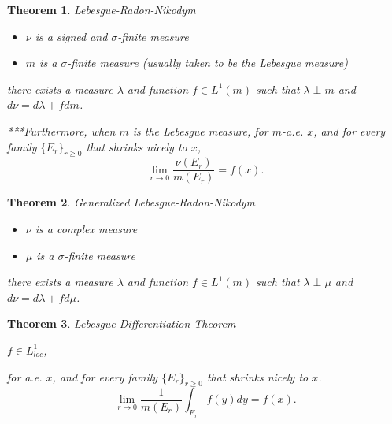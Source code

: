\documentclass[12pt]{Qual}
\newtheorem{theorem}{Theorem}
\begin{document}
\begin{theorem}{\Large\textit{Lebesgue-Radon-Nikodym}}

\vspace{-0.25cm}
\begin{itemize}[leftmargin=2.5cm]
\setlength\itemsep{-0.1em}
\renewcommand\labelitemi{\faPuzzlePiece}
    \item $\nu$ is a signed and $\sigma$-finite measure
    \item $m$ is a $\sigma$-finite measure (usually taken to be the Lebesgue measure)
\end{itemize}

 \hspace{0.1cm}\begin{minipage}{0.85\textwidth}
\vspace{0.45cm}
there exists a measure $\lambda$ and function $f\in L^1(m)$ such that $\lambda\perp m$ and $d\nu=d\lambda+fdm$.
\end{minipage}

\begin{mybox}
***Furthermore, when $m$ is the Lebesgue measure, for $m$-a.e. $x$, and for every family $\{E_r\}_{r\ge0}$ that shrinks nicely to $x$, $$\lim_{r\to0}\frac{\nu(E_r)}{m(E_r)}=f(x).$$
\end{mybox}

\end{theorem}
\vspace{0.5cm}
\begin{theorem}{\Large\textit{Generalized Lebesgue-Radon-Nikodym}}

\vspace{-0.25cm}
\begin{itemize}[leftmargin=2.5cm]
\setlength\itemsep{-0.1em}
\renewcommand\labelitemi{\faPuzzlePiece}
    \item $\nu$ is a complex measure
    \item $\mu$ is a $\sigma$-finite measure
\end{itemize}

 \hspace{0.1cm}\begin{minipage}{0.85\textwidth}
\vspace{0.45cm}
there exists a measure $\lambda$ and function $f\in L^1(m)$ such that $\lambda\perp \mu$ and $d\nu=d\lambda+fd\mu$.
\end{minipage}

\end{theorem}
\vspace{0.5cm}
\begin{theorem}{\Large\textit{Lebesgue Differentiation Theorem}}

 $f\in L_{loc}^1$,

 for a.e. $x$, and for every family $\{E_r\}_{r\ge0}$ that shrinks nicely to $x$. $$\lim_{r\to0}\frac{1}{m(E_r)}\int_{E_r}f(y)dy=f(x).$$

\end{theorem}
\vspace{0.5cm}
\end{document}
